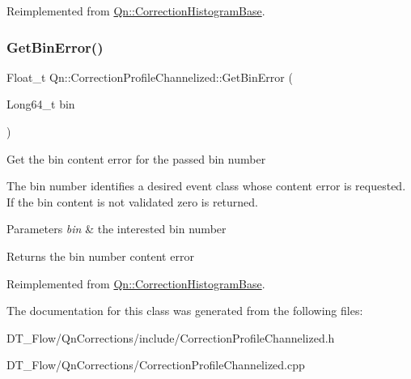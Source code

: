 Reimplemented from \mbox{\hyperlink{classQn_1_1CorrectionHistogramBase_a9e4e745a6f4cbebf5b9277d6d63bc9c7}{Qn\+::\+Correction\+Histogram\+Base}}.

\mbox{\label{classQn_1_1CorrectionProfileChannelized_a68b390bb4d744453239bca73a1c3ca84}} 
\subsubsection{\texorpdfstring{Get\+Bin\+Error()}{GetBinError()}}
{\footnotesize\ttfamily Float\+\_\+t Qn\+::\+Correction\+Profile\+Channelized\+::\+Get\+Bin\+Error (\begin{DoxyParamCaption}\item[{Long64\+\_\+t}]{bin }\end{DoxyParamCaption})\hspace{0.3cm}{\ttfamily [virtual]}}

Get the bin content error for the passed bin number

The bin number identifies a desired event class whose content error is requested. If the bin content is not validated zero is returned.


\begin{DoxyParams}{Parameters}
{\em bin} & the interested bin number \\
\hline
\end{DoxyParams}
\begin{DoxyReturn}{Returns}
the bin number content error 
\end{DoxyReturn}


Reimplemented from \mbox{\hyperlink{classQn_1_1CorrectionHistogramBase_a50a7dd4c5bbe5e4d0e405365c2a9104d}{Qn\+::\+Correction\+Histogram\+Base}}.



The documentation for this class was generated from the following files\+:\begin{DoxyCompactItemize}
\item 
D\+T\+\_\+\+Flow/\+Qn\+Corrections/include/Correction\+Profile\+Channelized.\+h\item 
D\+T\+\_\+\+Flow/\+Qn\+Corrections/Correction\+Profile\+Channelized.\+cpp\end{DoxyCompactItemize}
